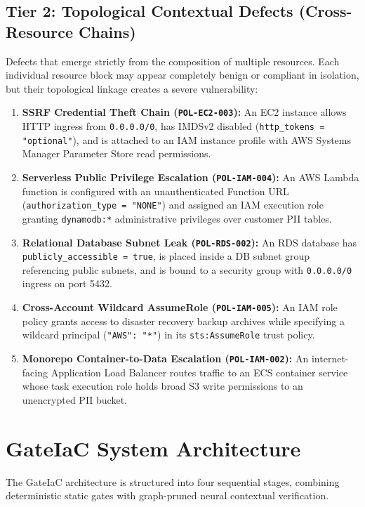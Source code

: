 \documentclass[conference]{IEEEtran}
\begin{document}
\subsection{Tier 2: Topological Contextual Defects (Cross-Resource Chains)}
Defects that emerge strictly from the composition of multiple resources. Each individual resource block may appear completely benign or compliant in isolation, but their topological linkage creates a severe vulnerability:
\begin{enumerate}
    \item \textbf{SSRF Credential Theft Chain (\texttt{POL-EC2-003}):} An EC2 instance allows HTTP ingress from \texttt{0.0.0.0/0}, has IMDSv2 disabled (\texttt{http\_tokens = "optional"}), and is attached to an IAM instance profile with AWS Systems Manager Parameter Store read permissions.
    \item \textbf{Serverless Public Privilege Escalation (\texttt{POL-IAM-004}):} An AWS Lambda function is configured with an unauthenticated Function URL (\texttt{authorization\_type = "NONE"}) and assigned an IAM execution role granting \texttt{dynamodb:*} administrative privileges over customer PII tables.
    \item \textbf{Relational Database Subnet Leak (\texttt{POL-RDS-002}):} An RDS database has \texttt{publicly\_accessible = true}, is placed inside a DB subnet group referencing public subnets, and is bound to a security group with \texttt{0.0.0.0/0} ingress on port 5432.
    \item \textbf{Cross-Account Wildcard AssumeRole (\texttt{POL-IAM-005}):} An IAM role policy grants access to disaster recovery backup archives while specifying a wildcard principal (\texttt{"AWS": "*"}) in its \texttt{sts:AssumeRole} trust policy.
    \item \textbf{Monorepo Container-to-Data Escalation (\texttt{POL-IAM-002}):} An internet-facing Application Load Balancer routes traffic to an ECS container service whose task execution role holds broad S3 write permissions to an unencrypted PII bucket.
\end{enumerate}

\section{GateIaC System Architecture}

The GateIaC architecture is structured into four sequential stages, combining deterministic static gates with graph-pruned neural contextual verification.
\end{document}

